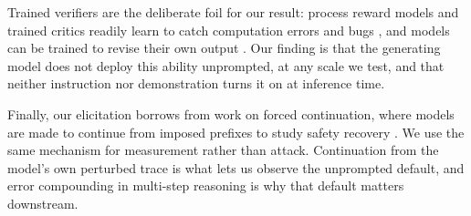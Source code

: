 Trained verifiers are the deliberate foil for our result: process reward models and trained critics readily learn to catch computation errors and bugs \citep{cobbe2021verifiers,uesato2022process,lightman2023,wang2024mathshepherd,saunders2022selfcritique,mcaleese2024critics}, and models can be trained to revise their own output \citep{welleck2023selfcorrect}. Our finding is that the generating model does not deploy this ability unprompted, at any scale we test, and that neither instruction nor demonstration turns it on at inference time.

Finally, our elicitation borrows from work on forced continuation, where models are made to continue from imposed prefixes to study safety recovery \citep{qi2025,vonrecum2026}. We use the same mechanism for measurement rather than attack. Continuation from the model's own perturbed trace is what lets us observe the unprompted default, and error compounding in multi-step reasoning \citep{dziri2023} is why that default matters downstream.
